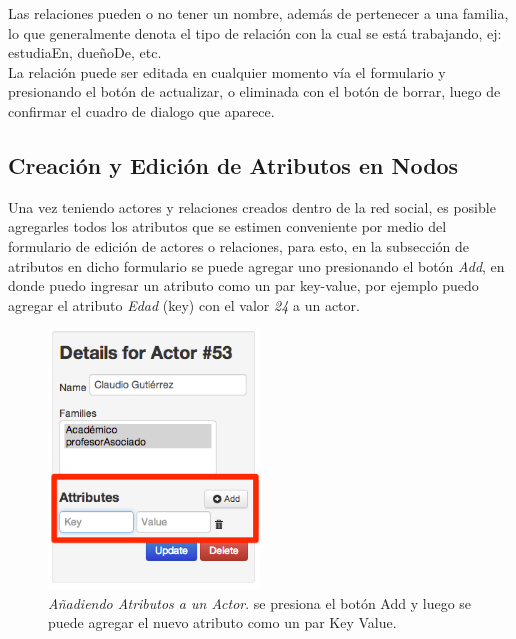 Las relaciones pueden o no tener un nombre, además de pertenecer a una familia, lo que generalmente denota el tipo de relación con la cual se está trabajando, ej: estudiaEn, dueñoDe, etc.\\

La relación puede ser editada en cualquier momento vía el formulario y presionando el botón de actualizar, o eliminada con el botón de borrar, luego de confirmar el cuadro de dialogo que aparece.


\subsection{Creación y Edición de Atributos en Nodos} %
\label{sub:creacion_y_edicion_de_atributos_en_nodos}

Una vez teniendo actores y relaciones creados dentro de la red social, es posible agregarles todos los atributos que se estimen conveniente por medio del formulario de edición de actores o relaciones, para esto, en la subsección de atributos en dicho formulario se puede agregar uno presionando el botón \emph{Add}, en donde puedo ingresar un atributo como un par key-value, por ejemplo puedo agregar el atributo \emph{Edad} (key) con el valor \emph{24} a un actor.

\begin{figure}[H]
  \centering
  \includegraphics[width=0.5\textwidth]{images/insercion_atributos.png}
  \caption[Añadiendo Atributos a un Actor]{\emph{Añadiendo Atributos a un Actor}. se presiona el botón Add y luego se puede agregar el nuevo atributo como un par Key Value.}
  \label{insercion_atributos}
\end{figure}

